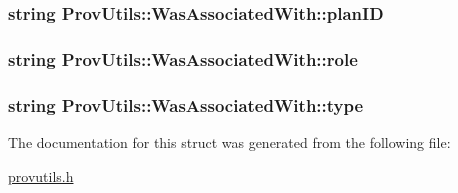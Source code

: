\hypertarget{struct_prov_utils_1_1_was_associated_with_ac85ee54813b5a8b7d46dc4b017d278ab}{
\subsubsection[{plan\-I\-D}]{\setlength{\rightskip}{0pt plus 5cm}string Prov\-Utils\-::\-Was\-Associated\-With\-::plan\-I\-D}}\label{struct_prov_utils_1_1_was_associated_with_ac85ee54813b5a8b7d46dc4b017d278ab}
\hypertarget{struct_prov_utils_1_1_was_associated_with_abc52263ea80c3bff0c6a7f492a27a28b}{
\subsubsection[{role}]{\setlength{\rightskip}{0pt plus 5cm}string Prov\-Utils\-::\-Was\-Associated\-With\-::role}}\label{struct_prov_utils_1_1_was_associated_with_abc52263ea80c3bff0c6a7f492a27a28b}
\hypertarget{struct_prov_utils_1_1_was_associated_with_a1af23db2361a85fe180b06f19a36a0d6}{
\subsubsection[{type}]{\setlength{\rightskip}{0pt plus 5cm}string Prov\-Utils\-::\-Was\-Associated\-With\-::type}}\label{struct_prov_utils_1_1_was_associated_with_a1af23db2361a85fe180b06f19a36a0d6}


The documentation for this struct was generated from the following file\-:\begin{DoxyCompactItemize}
\item 
\hyperlink{provutils_8h}{provutils.\-h}\end{DoxyCompactItemize}
